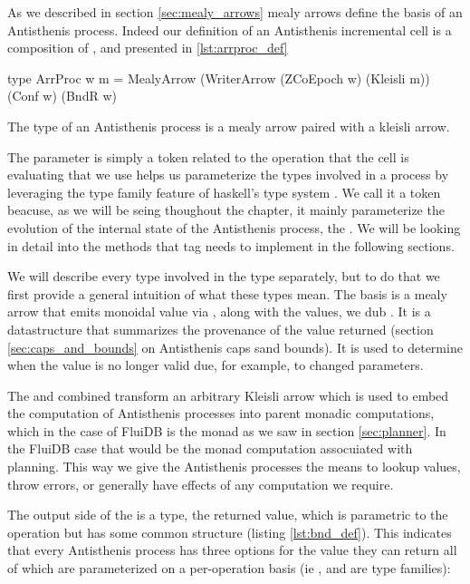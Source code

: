 As we described in section \ref{sec:mealy_arrows} mealy arrows define
the basis of an Antisthenis process. Indeed our definition of an
Antisthenis incremental cell is a composition of ,
 and  presented in
\ref{lst:arrproc_def}

\begin{code}
\begin{haskellcode}
type ArrProc w m =
  MealyArrow (WriterArrow (ZCoEpoch w) (Kleisli m))
  (Conf w) (BndR w)
\end{haskellcode}
\caption{\label{lst:arrproc_def}The type of an Antisthenis process is a mealy arrow paired
  with a kleisli arrow.}
\end{code}

The  parameter is simply a token related to the operation that
the cell is evaluating that we use helps us parameterize the types
involved in a process by leveraging the type family feature of
haskell's type system \cite{AssociatedTypeSynonyms}. We call it a
 token beacuse, as we will be seing thoughout the
chapter, it mainly parameterize the evolution of the internal state of
the Antisthenis process, the . We will be looking in
detail into the methods that  tag needs to
implement in the following sections.

We will describe every type involved in the  type
separately, but to do that we first provide a general intuition of
what these types mean. The basis is a mealy arrow that emits monoidal
value via , along with the values, we dub
.  It is a datastructure that summarizes the provenance
of the value returned (section \ref{sec:caps_and_bounds} on
Antisthenis caps sand bounds). It is used to determine when the value
is no longer valid due, for example, to changed parameters.

The  and  combined transform an
arbitrary Kleisli arrow which is used to embed the computation of
Antisthenis processes into parent monadic computations, which in the
case of FluiDB is the  monad as we saw in section
\ref{sec:planner}. In the FluiDB case that would be the monad
computation assocuiated with planning. This way we give the
Antisthenis processes the means to lookup values, throw errors, or
generally have effects of any computation we require.

The output side of the  is a  type, the
returned value, which is parametric to the operation but has some
common structure (listing \ref{lst:bnd_def}). This indicates that every
Antisthenis process has three options for the value they can return
all of which are parameterized on a per-operation basis (ie
,  and  are type families):


